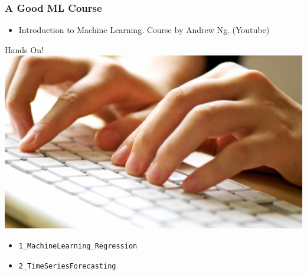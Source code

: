 \documentclass[xcolor=pdftex,dvipsnames]{beamer}
\begin{document}
\begin{frame}
  \frametitle{A Good ML Course}
    \begin{itemize}
    \item Introduction to Machine Learning. Course by  Andrew Ng. (Youtube)
    \end{itemize}
\end{frame}

\begin{frame}
  \begin{center}
    \Large Hands On! \\ \vspace{0.3cm}
    \includegraphics[scale=0.3]{./fig/hands_on.png}
  \end{center}
  \begin{itemize}
  \item \texttt{1\_MachineLearning\_Regression}
  \item \texttt{2\_TimeSeriesForecasting}
  \end{itemize}
\end{frame}
\end{document}
